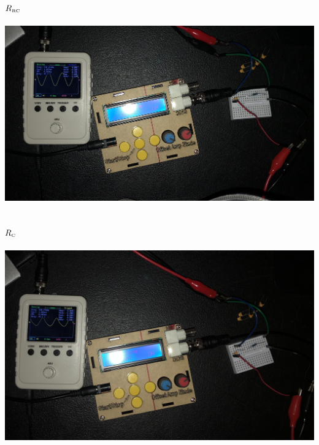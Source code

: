 \documentclass{article}
\def\R#1#2{\(#1_{\text{\tiny#2}}\)}
\begin{document}
\begin{center}
  \subsection*{\R{R}{RC}}
  \includegraphics[scale=0.1]{Vrc.jpeg}
  \subsection*{\R{R}{C}}
  \includegraphics[scale=0.1]{Vr.jpeg}
\end{center}
\end{document}
